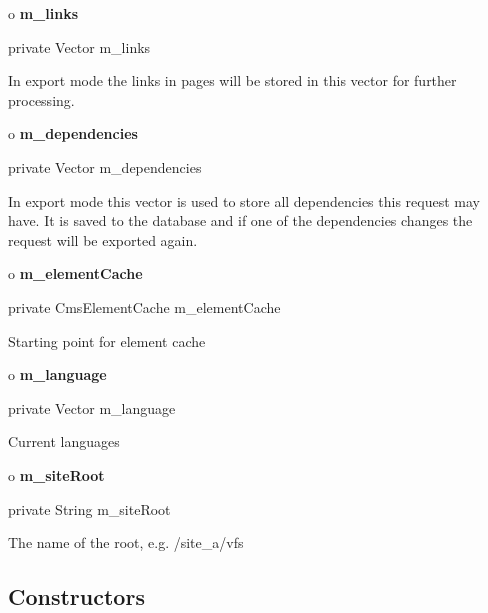o {\bf m\_links} 

\begin{PRE}
 private Vector m\_links
\end{PRE}

\begin{description}
\htmlDD In export mode the links in pages will be stored in this vector for
further processing.

\end{description}

o {\bf m\_dependencies} 

\begin{PRE}
 private Vector m\_dependencies
\end{PRE}

\begin{description}
\htmlDD In export mode this vector is used to store all dependencies this
request may have. It is saved to the database and if one of the dependencies
changes the request will be exported again.

\end{description}

o {\bf m\_elementCache} 

\begin{PRE}
 private CmsElementCache m\_elementCache
\end{PRE}

\begin{description}
\htmlDD Starting point for element cache

\end{description}

o {\bf m\_language} 

\begin{PRE}
 private Vector m\_language
\end{PRE}

\begin{description}
\htmlDD Current languages

\end{description}

o {\bf m\_siteRoot} 

\begin{PRE}
 private String m\_siteRoot
\end{PRE}

\begin{description}
\htmlDD The name of the root, e.g. /site\_a/vfs

\end{description}

\subsection*{  Constructors }


